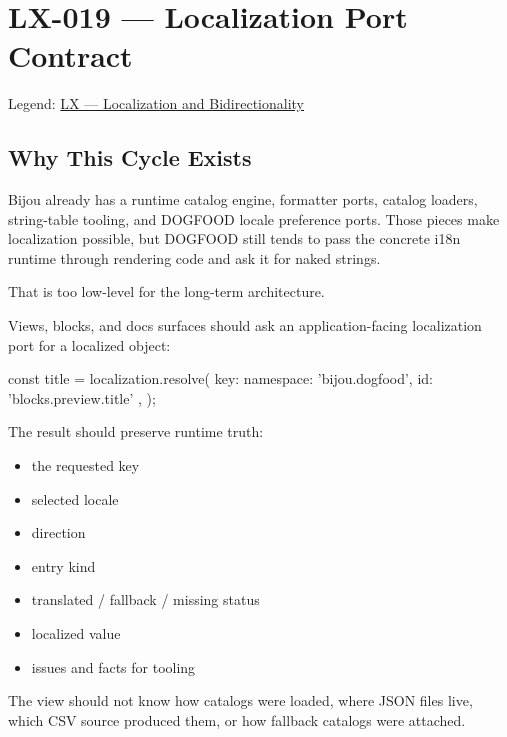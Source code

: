 \chapter{LX-019 --- Localization Port Contract}\label{record-195}

\smallskip

Legend: \href{https://github.com/flyingrobots/bijou/blob/1853ad902f6bf219326409e7f743a5a1d6517dbc/docs/legends/LX-localization-and-bidirectionality.md}{LX --- Localization and Bidirectionality}

\section{Why This Cycle Exists}\label{record-195-why-this-cycle-exists}

Bijou already has a runtime catalog engine, formatter ports, catalog loaders, string-table tooling, and DOGFOOD locale preference ports. Those pieces make localization possible, but DOGFOOD still tends to pass the concrete i18n runtime through rendering code and ask it for naked strings.

That is too low-level for the long-term architecture.

Views, blocks, and docs surfaces should ask an application-facing localization port for a localized object:

\begin{CodeBlock}
const title = localization.resolve({
  key: { namespace: 'bijou.dogfood', id: 'blocks.preview.title' },
});
\end{CodeBlock}

The result should preserve runtime truth:

\begin{itemize}
\tightlist
\item
  the requested key
\item
  selected locale
\item
  direction
\item
  entry kind
\item
  translated / fallback / missing status
\item
  localized value
\item
  issues and facts for tooling
\end{itemize}

The view should not know how catalogs were loaded, where JSON files live, which CSV source produced them, or how fallback catalogs were attached.

